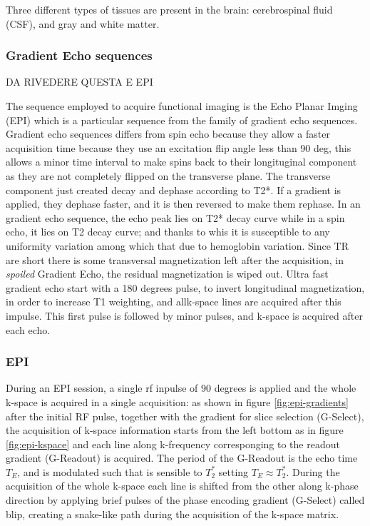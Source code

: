 \documentclass[a4paper,11pt]{article}
\begin{document}
Three different types of tissues are present in the brain: cerebrospinal fluid (CSF), and gray and white matter.
\subsubsection{Gradient Echo sequences}
DA RIVEDERE QUESTA E EPI

The sequence employed to acquire functional imaging is the Echo Planar Imging (EPI) which is a particular sequence from the family of gradient echo sequences.
Gradient echo sequences differs from spin echo because they allow a faster acquisition time because they use an excitation flip angle less than 90 deg, this allows a minor time interval to make spins back to their longituginal component as they are not completely flipped on the transverse plane.
The transverse component just created decay and dephase according to T2*. If a gradient is applied, they dephase faster, and it is then reversed to make them rephase.
In an gradient echo sequence, the echo peak lies on T2* decay curve while in a spin echo, it lies on T2 decay curve; and thanks to whis it is susceptible to any uniformity variation among which that due to hemoglobin variation.
Since TR are short there is some transversal magnetization left after the acquisition, in \emph{spoiled} Gradient Echo, the residual magnetization is wiped out.
Ultra fast gradient echo start with a 180 degrees pulse, to invert longitudinal magnetization, in order to increase T1 weighting, and allk-space lines are acquired after this impulse. This first pulse is followed by minor pulses, and k-space is acquired after each echo.


\subsubsection{EPI}
During an EPI session, a single rf inpulse of 90 degrees is applied and the whole k-space is acquired in a single acquisition:
as shown in figure \ref{fig:epi-gradients} after the initial RF pulse, together with the gradient for slice selection (G-Select), the acquisition of k-space information starts from the left bottom as in figure \ref{fig:epi-kspace} and each line along k-frequency corresponging to the readout gradient (G-Readout) is acquired.
The period of the G-Readout is the echo time $T_E$, and is modulated such that is sensible to $T_2^{\ast}$ setting $T_E \approx T_2^{\ast}$.
During the acquisition of the whole k-space each line is shifted from the other along k-phase direction by applying brief pulses of the phase encoding gradient (G-Select) called blip, creating a snake-like path during the acquisition of the k-space matrix.
\end{document}
